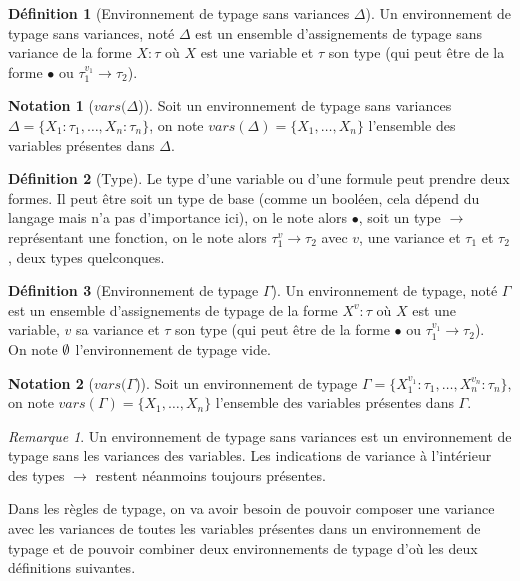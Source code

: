 \documentclass{rapport}
\renewcommand{\emptyset}{\font\cmsy = cmsy10 at 10pt
 \hbox{\cmsy \char 59}
}
\theoremstyle{plain}
\theoremstyle{remark}
\newtheorem{rema}{Remarque}
\theoremstyle{definition}
\newtheorem{notat}{Notation}
\newtheorem{dfn}{Définition}
\begin{document}
\begin{dfn} [Environnement de typage sans variances $\Delta$] Un environnement de typage sans variances, noté $\Delta$ est un ensemble d'assignements de typage sans variance de la forme ${X : \tau}$ où $X$ est une variable et $\tau$ son type (qui peut être de la forme $\bullet$ ou ${\tau_1^{v_1} \rightarrow \tau_2}$).  
\end{dfn}

\begin{notat} [$vars(\Delta$)] Soit un environnement de typage sans variances ${\Delta = \{X_1 : \tau_1, \ldots, X_n : \tau_n\}}$, on note ${vars(\Delta) = \{X_1, \ldots, X_n\}}$ l'ensemble des variables présentes dans $\Delta$.
\end{notat}

\begin{dfn}[Type] Le type d'une variable ou d'une formule peut prendre deux formes. Il peut être soit un type de base (comme un booléen, cela dépend du langage mais n'a pas d'importance ici), on le note alors $\bullet$, soit un type $\rightarrow$ représentant une fonction, on le note alors $\tau_1^{v} \rightarrow \tau_2$ avec $v$, une variance et $\tau_1$ et $\tau_2$, deux types quelconques. 
\end{dfn}

\begin{dfn} [Environnement de typage $\Gamma$] Un environnement de typage, noté $\Gamma$ est un ensemble d'assignements de typage de la forme ${X^v : \tau}$ où $X$ est une variable, $v$ sa variance et $\tau$ son type (qui peut être de la forme $\bullet$ ou ${\tau_1^{v_1} \rightarrow \tau_2}$). \\ 
On note $\emptyset$ l'environnement de typage vide.
\end{dfn}

\begin{notat} [$vars(\Gamma$)] Soit un environnement de typage ${\Gamma = \{X_1^{v_1} : \tau_1, \ldots, X_n^{v_n} : \tau_n\}}$, on note ${vars(\Gamma) = \{X_1, \ldots, X_n\}}$ l'ensemble des variables présentes dans $\Gamma$.
\end{notat}

\begin{rema}
Un environnement de typage sans variances est un environnement de typage sans les variances des variables. Les indications de variance à l'intérieur des types $\rightarrow$ restent néanmoins toujours présentes. 
\end{rema}

Dans les règles de typage, on va avoir besoin de pouvoir composer une variance avec les variances de toutes les variables présentes dans un environnement de typage et de pouvoir combiner deux environnements de typage d'où les deux définitions suivantes.
\end{document}
